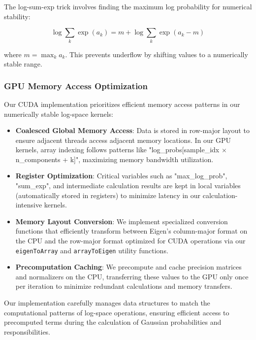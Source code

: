 \documentclass[conference]{IEEEtran}
\begin{document}
The log-sum-exp trick involves finding the maximum log probability for numerical stability:

\begin{equation}
\log\sum_{k} \exp(a_k) = m + \log\sum_{k} \exp(a_k - m)
\end{equation}

\noindent where $m = \max_k a_k$. This prevents underflow by shifting values to a numerically stable range.

\subsubsection{GPU Memory Access Optimization}

Our CUDA implementation prioritizes efficient memory access patterns in our numerically stable log-space kernels:

\begin{itemize}
    \item \textbf{Coalesced Global Memory Access}: Data is stored in row-major layout to ensure adjacent threads access adjacent memory locations. In our GPU kernels, array indexing follows patterns like "log\_probs[sample\_idx $\times$ n\_components + k]", maximizing memory bandwidth utilization.
    
    \item \textbf{Register Optimization}: Critical variables such as "max\_log\_prob", "sum\_exp", and intermediate calculation results are kept in local variables (automatically stored in registers) to minimize latency in our calculation-intensive kernels.
    
    \item \textbf{Memory Layout Conversion}: We implement specialized conversion functions that efficiently transform between Eigen's column-major format on the CPU and the row-major format optimized for CUDA operations via our \texttt{eigenToArray} and \texttt{arrayToEigen} utility functions.
    
    \item \textbf{Precomputation Caching}: We precompute and cache precision matrices and normalizers on the CPU, transferring these values to the GPU only once per iteration to minimize redundant calculations and memory transfers.
\end{itemize}

Our implementation carefully manages data structures to match the computational patterns of log-space operations, ensuring efficient access to precomputed terms during the calculation of Gaussian probabilities and responsibilities.
\end{document}
